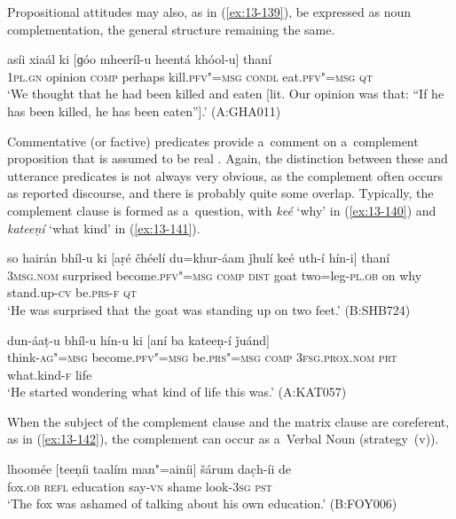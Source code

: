 Propositional attitudes may also, as in (\ref{ex:13-139}), be expressed as noun complementation, the general structure remaining the same.

\begin{exe}
\ex
\label{ex:13-139}
\gll asíi xiaál ki [ɡóo mheeríl-u heentá  khóol-u] thaní \\
\textsc{1pl}.\textsc{gn}  opinion \textsc{comp} perhaps kill.\textsc{pfv"=msg}  \textsc{condl} eat.\textsc{pfv"=msg} \textsc{qt} \\
\glt `We thought that he had been killed and eaten [lit. Our opinion was that: ``If he has been killed, he has been eaten''].' (A:GHA011) 
\end{exe}

 Commentative (or factive) predicates provide a~comment on a~complement proposition that is assumed to be real \citep[127--129]{noonan2007}. Again, the distinction between these and utterance predicates is not always very obvious, as the complement often occurs as reported discourse, and there is probably quite some overlap. Typically, the complement clause is formed as a~question, with \textit{keé} `why' in (\ref{ex:13-140}) and \textit{kateeṇí} `what kind' in (\ref{ex:13-141}).

\begin{exe}
\ex
\label{ex:13-140}
\gll so hairán bhíl-u ki [aṛé čhéelí  du=khur-áam ǰhulí keé uth-í hín-i] thaní \\
\textsc{3msg.nom}  surprised become.\textsc{pfv"=msg} \textsc{comp} \textsc{dist} goat  two=leg-\textsc{pl.ob} on why stand.up-\textsc{cv} be.\textsc{prs-f} \textsc{qt} \\
\glt `He was surprised that the goat was standing up on two feet.' (B:SHB724)

\ex
\label{ex:13-141}
\gll dun-áaṭ-u bhíl-u hín-u ki  [aní ba kateeṇ-í ǰuánd] \\
think-\textsc{ag"=msg} become.\textsc{pfv"=msg} be.\textsc{prs"=msg} \textsc{comp}  \textsc{3fsg.prox.nom} \textsc{prt} what.kind-\textsc{f} life  \\
\glt `He started wondering what kind of life this was.' (A:KAT057) 
\end{exe}

When the subject of the complement clause and the matrix clause are coreferent, as in (\ref{ex:13-142}), the complement can occur as a~Verbal Noun (strategy~(v)).

\begin{exe}
\ex
\label{ex:13-142}
\gll lhoomée [teeṇíi taalím man"=ainíi] šárum  dac̣h-íi de \\
fox.\textsc{ob} \textsc{ refl} education say-\textsc{vn} shame look-\textsc{3sg} \textsc{pst} \\
\glt `The fox was ashamed of talking about his own education.' (B:FOY006) 
\end{exe}

